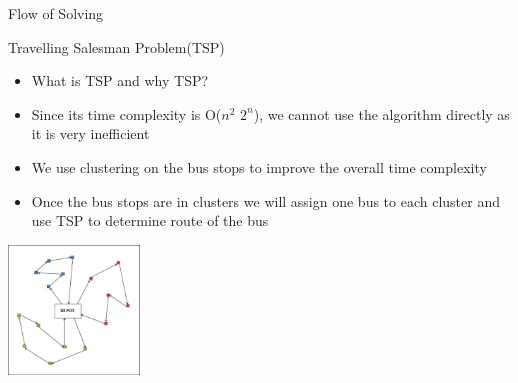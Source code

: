\documentclass{beamer}
\begin{document}
\begin{frame}{Flow of Solving}
\begin{center}
\end{center}
\end{frame}
\begin{frame}{Travelling Salesman Problem(TSP)}

\begin{itemize}[<+- | alert@+>]

\item What is TSP and why TSP?
\item Since its time complexity is O($n^2$ $2^n$), we cannot use the algorithm directly as it is very inefficient
\item We use clustering on the bus stops to improve the overall time complexity
\item Once the bus stops are in clusters we will assign one bus to each cluster and use TSP to determine route of the bus

\end{itemize}
\centering
\includegraphics[width=3.5cm]{bosch_img1.jpg}
\end{frame}
\end{document}
